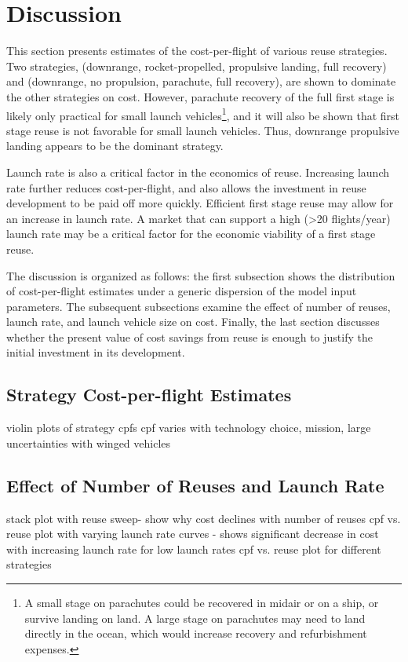 \documentclass[conf]{new-aiaa}
\begin{document}
\section{Discussion}

This section presents estimates of the cost-per-flight of various reuse strategies. Two strategies, (downrange, rocket-propelled, propulsive landing, full recovery) and (downrange, no propulsion, parachute, full recovery), are shown to dominate the other strategies on cost. However, parachute recovery of the full first stage is likely only practical for small launch vehicles\footnote{A small stage on parachutes could be recovered in midair or on a ship, or survive landing on land. A large stage on parachutes may need to land directly in the ocean, which would increase recovery and refurbishment expenses.}, and it will also be shown that first stage reuse is not favorable for small launch vehicles. Thus, downrange propulsive landing appears to be the dominant strategy.

Launch rate is also a critical factor in the economics of reuse. Increasing launch rate further reduces cost-per-flight, and also allows the investment in reuse development to be paid off more quickly. Efficient first stage reuse may allow for an increase in launch rate. A market that can support a high (>20 flights/year) launch rate may be a critical factor for the economic viability of a first stage reuse.

The discussion is organized as follows: the first subsection shows the distribution of cost-per-flight estimates under a generic dispersion of the model input parameters. The subsequent subsections examine the effect of number of reuses, launch rate, and launch vehicle size on cost. Finally, the last section discusses whether the present value of cost savings from reuse is enough to justify the initial investment in its development.

\subsection{Strategy Cost-per-flight Estimates}
violin plots of strategy cpfs
cpf varies with technology choice, mission, large uncertainties with winged vehicles

\subsection{Effect of Number of Reuses and Launch Rate}
stack plot with reuse sweep- show why cost declines with number of reuses
cpf vs. reuse plot with varying launch rate curves - shows significant decrease in cost with increasing launch rate for low launch rates
cpf vs. reuse plot for different strategies 
\end{document}
